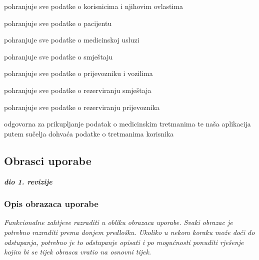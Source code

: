 \begin{packed_enum}
				\item  {}
				
				\begin{packed_enum}
					
					\item pohranjuje sve podatke o korisnicima i njihovim ovlastima 
					\item pohranjuje sve podatke o pacijentu
					\item pohranjuje sve podatke o medicinskoj usluzi 
					\item pohranjuje sve podatke o smještaju 
					\item pohranjuje sve podatke o prijevozniku i vozilima
					\item pohranjuje sve podatke o rezerviranju smještaja 
					\item pohranjuje sve podatke o rezerviranju prijevoznika 
					
				\end{packed_enum}
				
				\item  {}
				
				\begin{packed_enum}
					
					\item odgovorna za prikupljanje podatak o medicinskim tretmanima te naša aplikacija putem sučelja dohvaća podatke o tretmanima korisnika
					
				\end{packed_enum}
				
				
			\end{packed_enum}
			
			\eject 
			
			
				
			\subsection{Obrasci uporabe}
				
				\textbf{\textit{dio 1. revizije}}
				
				\subsubsection{Opis obrazaca uporabe}
					\textit{Funkcionalne zahtjeve razraditi u obliku obrazaca uporabe. Svaki obrazac je potrebno razraditi prema donjem predlošku. Ukoliko u nekom koraku može doći do odstupanja, potrebno je to odstupanje opisati i po mogućnosti ponuditi rješenje kojim bi se tijek obrasca vratio na osnovni tijek.}\\
					

